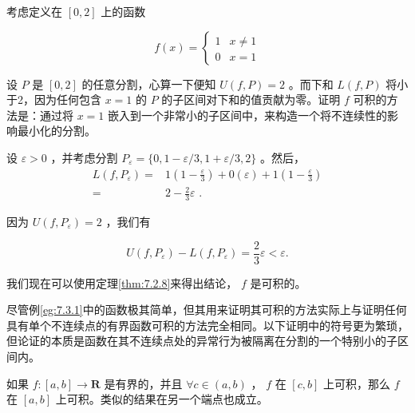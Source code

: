 \begin{Eg}\label{eg:7.3.1}
考虑定义在 $[0,2]$ 上的函数

\[
f\left( x\right)  = \left\{  \begin{array}{ll} 1 & x \neq  1 \\  0 &x = 1 \end{array}\right.
\]

设 \(P\) 是 \(\left\lbrack  {0,2}\right\rbrack\) 的任意分割，心算一下便知 \(U\left( {f,P}\right)  = 2\) 。而下和 \(L\left( {f,P}\right)\) 将小于2，因为任何包含 \(x = 1\) 的 \(P\) 的子区间对下和的值贡献为零。证明 \(f\) 可积的方法是：通过将 \(x = 1\) 嵌入到一个非常小的子区间中，来构造一个将不连续性的影响最小化的分割。

设 \(\varepsilon  > 0\) ，并考虑分割 \({P}_{\varepsilon } = \{ 0,1 - \varepsilon /3,1 + \varepsilon /3,2\}\) 。然后，
\begin{align*}
L\left( {f,{P}_{\varepsilon }}\right)  = & 1\left( {1 - \frac{\varepsilon }{3}}\right)  + 0\left( \varepsilon \right)  + 1\left( {1 - \frac{\varepsilon }{3}}\right)\\
= &  2 - \frac{2}{3}\varepsilon \text{ . }
\end{align*}

因为 \(U\left( {f,{P}_{\varepsilon }}\right)  = 2\) ，我们有

\[
U\left( {f,{P}_{\varepsilon }}\right)  - L\left( {f,{P}_{\varepsilon }}\right)  = \frac{2}{3}\varepsilon  < \varepsilon .
\]

我们现在可以使用定理\ref{thm:7.2.8}来得出结论， \(f\) 是可积的。
  
\end{Eg}


尽管例\ref{eg:7.3.1}中的函数极其简单，但其用来证明其可积的方法实际上与证明任何具有单个不连续点的有界函数可积的方法完全相同。以下证明中的符号更为繁琐，但论证的本质是函数在其不连续点处的异常行为被隔离在分割的一个特别小的子区间内。


\begin{Thm}
  \label{thm:7.3.2}
如果 \(f : \left\lbrack  {a,b}\right\rbrack   \rightarrow  \mathbf{R}\) 是有界的，并且 \(\forall c \in  \left( {a,b}\right)\) ， \(f\) 在 \(\left\lbrack  {c,b}\right\rbrack\) 上可积，那么 \(f\) 在 \(\left\lbrack  {a,b}\right\rbrack\) 上可积。类似的结果在另一个端点也成立。  
\end{Thm}


